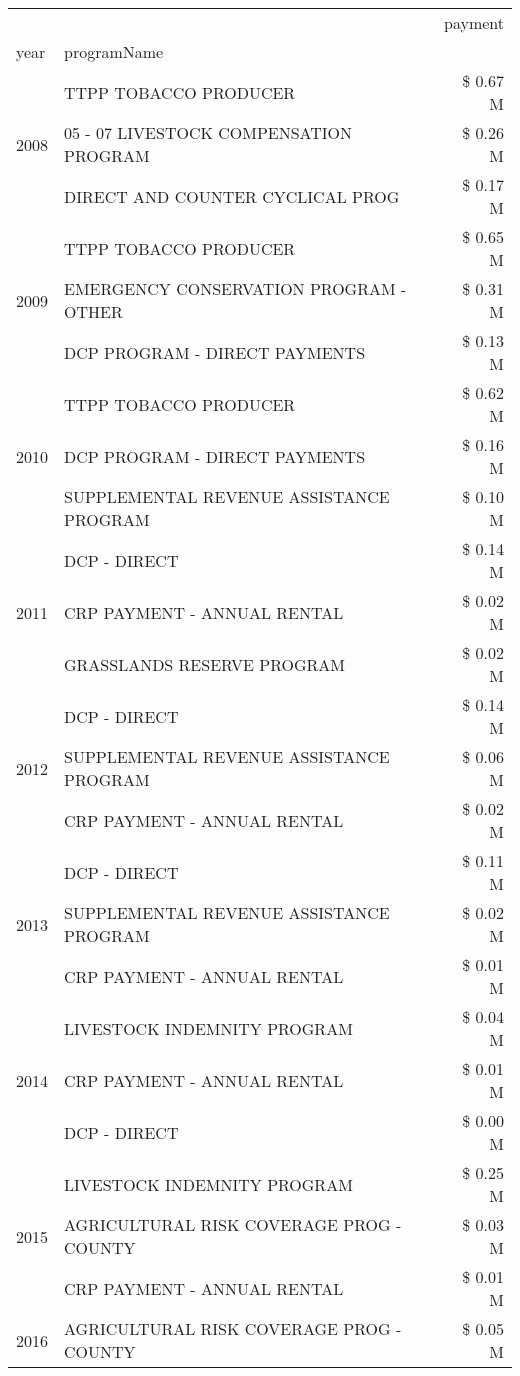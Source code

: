 \begin{tabular}{llr}
\toprule
 &  & payment \\
year & programName &  \\
\midrule
\multirow[t]{3}{*}{2008} & TTPP TOBACCO PRODUCER & \$ 0.67 M \\
 & 05 - 07 LIVESTOCK COMPENSATION PROGRAM & \$ 0.26 M \\
 & DIRECT AND COUNTER CYCLICAL PROG & \$ 0.17 M \\
\cline{1-3}
\multirow[t]{3}{*}{2009} & TTPP TOBACCO PRODUCER & \$ 0.65 M \\
 & EMERGENCY CONSERVATION PROGRAM - OTHER & \$ 0.31 M \\
 & DCP PROGRAM - DIRECT PAYMENTS & \$ 0.13 M \\
\cline{1-3}
\multirow[t]{3}{*}{2010} & TTPP TOBACCO PRODUCER & \$ 0.62 M \\
 & DCP PROGRAM - DIRECT PAYMENTS & \$ 0.16 M \\
 & SUPPLEMENTAL REVENUE ASSISTANCE PROGRAM & \$ 0.10 M \\
\cline{1-3}
\multirow[t]{3}{*}{2011} & DCP - DIRECT & \$ 0.14 M \\
 & CRP PAYMENT - ANNUAL RENTAL & \$ 0.02 M \\
 & GRASSLANDS RESERVE PROGRAM & \$ 0.02 M \\
\cline{1-3}
\multirow[t]{3}{*}{2012} & DCP - DIRECT & \$ 0.14 M \\
 & SUPPLEMENTAL REVENUE ASSISTANCE PROGRAM & \$ 0.06 M \\
 & CRP PAYMENT - ANNUAL RENTAL & \$ 0.02 M \\
\cline{1-3}
\multirow[t]{3}{*}{2013} & DCP - DIRECT & \$ 0.11 M \\
 & SUPPLEMENTAL REVENUE ASSISTANCE PROGRAM & \$ 0.02 M \\
 & CRP PAYMENT - ANNUAL RENTAL & \$ 0.01 M \\
\cline{1-3}
\multirow[t]{3}{*}{2014} & LIVESTOCK INDEMNITY PROGRAM & \$ 0.04 M \\
 & CRP PAYMENT - ANNUAL RENTAL & \$ 0.01 M \\
 & DCP - DIRECT & \$ 0.00 M \\
\cline{1-3}
\multirow[t]{3}{*}{2015} & LIVESTOCK INDEMNITY PROGRAM & \$ 0.25 M \\
 & AGRICULTURAL RISK COVERAGE PROG - COUNTY & \$ 0.03 M \\
 & CRP PAYMENT - ANNUAL RENTAL & \$ 0.01 M \\
\cline{1-3}
\multirow[t]{3}{*}{2016} & AGRICULTURAL RISK COVERAGE PROG - COUNTY & \$ 0.05 M \\

\end{tabular}
